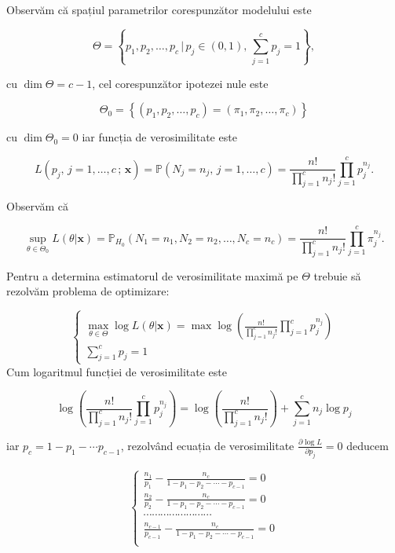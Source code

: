 \documentclass[]{article}
\begin{document}
Observăm că spațiul parametrilor corespunzător modelului este

\[
\Theta = \left\{p_1, p_2, \ldots, p_c\,|\,p_{j}\in(0,1),\,\sum_{j = 1}^{c}p_{j} = 1\right\},
\]

cu \(\dim{\Theta} = c-1\), cel corespunzător ipotezei nule este

\[
\Theta_0 = \left\{(p_1,p_2,\ldots, p_c) = (\pi_1,\pi_2,\ldots, \pi_c)\right\}
\]

cu \(\dim{\Theta_0} = 0\) iar funcția de verosimilitate este

\[
  L(p_{j},\,j = 1,\ldots,c\,;\,\mathbf{x}) = \mathbb{P}(N_{j} = n_{j}, \,j = 1,\ldots,c) = \frac{n!}{\prod_{j = 1}^{c} n_{j}!}\prod_{j = 1}^{c} p_{j}^{n_{j}}.
\]

Observăm că

\[
  \sup_{\theta\in\Theta_0}L(\theta|\mathbf{x}) = \mathbb{P}_{H_0}(N_1 = n_1, N_2 = n_2, \ldots, N_c = n_c) = \frac{n!}{\prod_{j = 1}^{c} n_{j}!}\prod_{j = 1}^{c} \pi_{j}^{n_{j}}.
\]

Pentru a determina estimatorul de verosimilitate maximă pe \(\Theta\)
trebuie să rezolvăm problema de optimizare:

\[
  \left\{\begin{array}{ll}
    \max_{\theta\in\Theta} \log L(\theta|\mathbf{x}) = \max \log{\left(\frac{n!}{\prod_{j = 1}^{c} n_{j}!}\prod_{j = 1}^{c} p_{j}^{n_{j}}\right)}\\
    \sum_{j = 1}^{c}p_{j} = 1
  \end{array}\right.
\] Cum logaritmul funcției de verosimilitate este

\[
\log{\left(\frac{n!}{\prod_{j = 1}^{c} n_{j}!}\prod_{j = 1}^{c} p_{j}^{n_{j}}\right)} = \log\left(\frac{n!}{\prod_{j = 1}^{c} n_{j}!}\right) + \sum_{j = 1}^{c}n_{j}\log{p_j}
\]

iar \(p_c = 1 - p_1 -\cdots p_{c-1}\), rezolvând ecuația de
verosimilitate \(\frac{\partial\log{L}}{\partial p_j} = 0\) deducem

\[
\left\{\begin{array}{llll}
  \frac{n_1}{p_1} - \frac{n_c}{1 - p_1 - p_2 -\cdots -p_{c-1}} = 0\\
  \frac{n_2}{p_2} - \frac{n_c}{1 - p_1 - p_2 -\cdots -p_{c-1}} = 0\\
  \cdots\cdots\cdots\cdots\cdots\cdots\cdots\cdots\\
  \frac{n_{c-1}}{p_{c-1}} - \frac{n_c}{1 - p_1 - p_2 -\cdots -p_{c-1}} = 0\\
\end{array}\right.
\]
\end{document}
